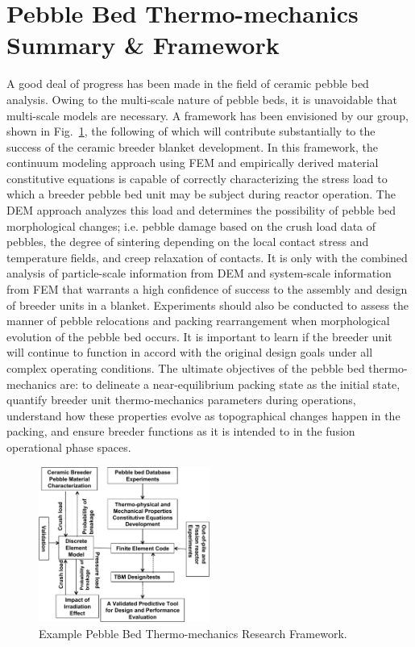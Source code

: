 \section{Pebble Bed Thermo-mechanics Summary \& Framework}
A good deal of progress has been made in the field of ceramic pebble bed analysis. Owing to the multi-scale nature of pebble beds, it is unavoidable that multi-scale models are necessary. A framework has been envisioned by our group, shown in Fig.~\ref{fig:framework}, the following of which will contribute substantially to the success of the ceramic breeder blanket development. In this framework, the continuum modeling approach using FEM and empirically derived material constitutive equations is capable of correctly characterizing the stress load to which a breeder pebble bed unit may be subject during reactor operation. The DEM approach analyzes this load and determines the possibility of pebble bed morphological changes; i.e. pebble damage based on the crush load data of pebbles, the degree of sintering depending on the local contact stress and temperature fields, and creep relaxation of contacts. It is only with the combined analysis of particle-scale information from DEM and system-scale information from FEM that warrants a high confidence of success to the assembly and design of breeder units in a blanket.  Experiments should also be conducted to assess the manner of pebble relocations and packing rearrangement when morphological evolution of the pebble bed occurs. It is important to learn if the breeder unit will continue to function in accord with the original design goals under all complex operating conditions.  The ultimate objectives of the pebble bed thermo-mechanics are: to delineate a near-equilibrium packing state as the initial state, quantify breeder unit thermo-mechanics parameters during operations, understand how these properties evolve as topographical changes happen in the packing, and ensure breeder functions as it is intended to in the fusion operational phase spaces.

\begin{figure}[t!]
	\begin{center}
	\includegraphics[width=0.5\textwidth]{chapters/figures/Fig-11}
	\caption{Example Pebble Bed Thermo-mechanics Research Framework.}
	\label{fig:framework}
	\end{center}
\end{figure}

